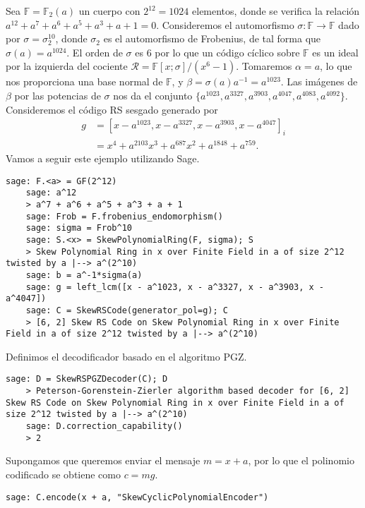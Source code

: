 \begin{example}
  Sea \(\mathbb F = \mathbb F_2(a)\) un cuerpo con \(2^{12} = 1024\) elementos, donde se verifica la relación \(a^{12} + a^7 + a^{6} + a^{5} + a^{3} + a + 1 = 0\).
  Consideremos el automorfismo \(\sigma: \mathbb F \to \mathbb F\) dado por \(\sigma = \sigma_2^{10}\), donde \(\sigma_2\) es el automorfismo de Frobenius, de tal forma que \(\sigma(a) = a^{1024}\).
  El orden de \(\sigma\) es \(6\) por lo que un código cíclico sobre \(\mathbb F\) es un ideal por la izquierda del cociente \(\mathcal R = \mathbb F[x; \sigma]/(x^{6} - 1)\).
  Tomaremos \(\alpha = a\), lo que nos proporciona una base normal de \(\mathbb F\), y \(\beta = \sigma(a)a^{-1} = a^{1023}\).
  Las imágenes de \(\beta\) por las potencias de \(\sigma\) nos da el conjunto \(\{a^{1023}, a^{3327}, a^{3903}, a^{4047}, a^{4083}, a^{4092}\}\).
  Consideremos el código RS sesgado generado por
  \begin{align*}
    g &= \left[x - a^{1023}, x - a^{3327}, x - a^{3903}, x - a^{4047}\right]_i \\
      &= x^4 + a^{2103}x^3 + a^{687}x^2 + a^{1848} + a^{759}.
  \end{align*}
  Vamos a seguir este ejemplo utilizando Sage.
  \begin{lstlisting}[gobble=4]
    sage: F.<a> = GF(2^12)
    sage: a^12
    > a^7 + a^6 + a^5 + a^3 + a + 1
    sage: Frob = F.frobenius_endomorphism()
    sage: sigma = Frob^10
    sage: S.<x> = SkewPolynomialRing(F, sigma); S
    > Skew Polynomial Ring in x over Finite Field in a of size 2^12 twisted by a |--> a^(2^10)
    sage: b = a^-1*sigma(a)
    sage: g = left_lcm([x - a^1023, x - a^3327, x - a^3903, x - a^4047])
    sage: C = SkewRSCode(generator_pol=g); C
    > [6, 2] Skew RS Code on Skew Polynomial Ring in x over Finite Field in a of size 2^12 twisted by a |--> a^(2^10)
  \end{lstlisting}
  Definimos el decodificador basado en el algoritmo PGZ.
  \begin{lstlisting}[gobble=4]
    sage: D = SkewRSPGZDecoder(C); D
    > Peterson-Gorenstein-Zierler algorithm based decoder for [6, 2] Skew RS Code on Skew Polynomial Ring in x over Finite Field in a of size 2^12 twisted by a |--> a^(2^10)
    sage: D.correction_capability()
    > 2
  \end{lstlisting}
  Supongamos que queremos enviar el mensaje \(m = x + a\), por lo que el polinomio codificado se obtiene como \(c = mg\).
  \begin{lstlisting}[gobble=4]
    sage: C.encode(x + a, "SkewCyclicPolynomialEncoder")

\end{lstlisting}
\end{example}
